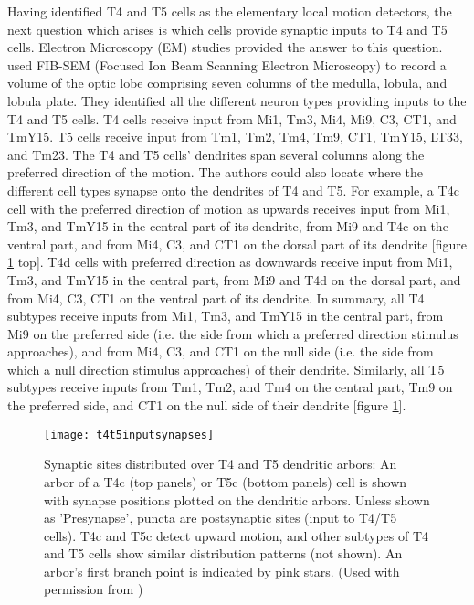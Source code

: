 Having identified T4 and T5 cells as the elementary local motion detectors, the next question which arises is which cells provide synaptic inputs to T4 and T5 cells. Electron Microscopy (EM) studies \parencite{Shinomiya2019, Takemura2017} provided the answer to this question. \cite{Shinomiya2019} used FIB-SEM (Focused Ion Beam Scanning Electron Microscopy) to record a volume of the optic lobe comprising seven columns of the medulla, lobula, and lobula plate. They identified all the different neuron types providing inputs to the T4 and T5 cells. T4 cells receive input from Mi1, Tm3, Mi4, Mi9, C3, CT1, and TmY15. T5 cells receive input from Tm1, Tm2, Tm4, Tm9, CT1, TmY15, LT33, and Tm23. The T4 and T5 cells' dendrites span several columns along the preferred direction of the motion. The authors could also locate where the different cell types synapse onto the dendrites of T4 and T5. For example, a T4c cell with the preferred direction of motion as upwards receives input from Mi1, Tm3, and TmY15 in the central part of its dendrite, from Mi9 and T4c on the ventral part, and from Mi4, C3, and CT1 on the dorsal part of its dendrite [figure \ref{fig:t4t5inputsynapses} top]. T4d cells with preferred direction as downwards receive input from Mi1, Tm3, and TmY15 in the central part, from Mi9 and T4d on the dorsal part, and from Mi4, C3, CT1 on the ventral part of its dendrite. In summary, all T4 subtypes receive inputs from Mi1, Tm3, and TmY15 in the central part, from Mi9 on the preferred side (i.e. the side from which a preferred direction stimulus approaches), and from Mi4, C3, and CT1 on the null side (i.e. the side from which a null direction stimulus approaches) of their dendrite. Similarly, all T5 subtypes receive inputs from Tm1, Tm2, and Tm4 on the central part, Tm9 on the preferred side, and CT1 on the null side of their dendrite [figure \ref{fig:t4t5inputsynapses}]. %

\begin{figure}
\centering
\hspace*{-1.4cm} 
\texttt{[image: t4t5inputsynapses]}
\caption[Synaptic sites distributed over T4 and T5 dendritic arbors]{Synaptic sites distributed over T4 and T5 dendritic arbors: An arbor of a T4c (top panels) or T5c (bottom panels) cell is shown with synapse positions plotted on the dendritic arbors. Unless shown as 'Presynapse', puncta are postsynaptic sites (input to T4/T5 cells). T4c and T5c detect upward motion, and other subtypes of T4 and T5 cells show similar distribution patterns (not shown). An arbor's first branch point is indicated by pink stars. (Used with permission from \cite{Shinomiya2019})}
\label{fig:t4t5inputsynapses}
\end{figure}

